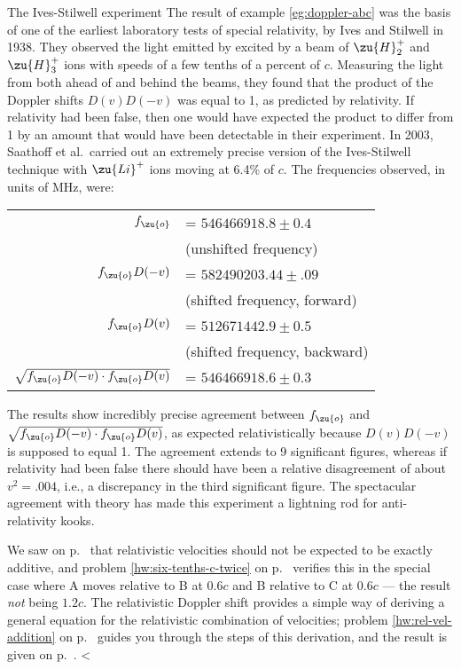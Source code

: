 \begin{eg}{The Ives-Stilwell experiment}
The result of example \ref{eg:doppler-abc} was the basis of one of the earliest laboratory tests of special relativity, by Ives and Stilwell in 1938.
They observed the light emitted by excited by a beam of $\zu{H}_2^+$ and $\zu{H}_3^+$ ions with speeds of a few tenths of a percent of $c$.
Measuring the light from both ahead of and behind the beams, they found that the product of the Doppler shifts $D(v)D(-v)$ was equal to 1,
as predicted by relativity. If relativity had been false, then one would have expected the product to differ from 1 by an amount that would
have been detectable in their experiment. In 2003, Saathoff et al.~carried out an extremely precise version of the Ives-Stilwell technique
with $\zu{Li}^+$ ions moving at 6.4\% of $c$. The frequencies observed, in units of MHz, were:

\noindent\begin{tabular}{rl}
$f_\zu{o}$ &=      $546466918.8  \pm 0.4$ \\
           & \hfill (unshifted frequency)\\
$f_\zu{o}D(-v)$ & =          $582490203.44 \pm .09$ \\
           & \hfill (shifted frequency, forward)\\
$f_\zu{o} D(v)$ & =          $512671442.9  \pm 0.5$ \\
           & \hfill (shifted frequency, backward)\\
$\sqrt{f_\zu{o}D(-v)\cdot f_\zu{o} D(v)}$ &= $546466918.6  \pm 0.3$ 
\end{tabular}

\noindent The results show incredibly precise agreement between $f_\zu{o}$ and $\sqrt{f_\zu{o}D(-v)\cdot f_\zu{o} D(v)}$, as expected
relativistically because $D(v)D(-v)$ is supposed to equal 1. The agreement extends to 9 significant figures, whereas
if relativity had been false there should have been a relative disagreement of about $v^2=.004$, i.e., a discrepancy in the third significant figure.
The spectacular agreement with theory has made this experiment a lightning rod for
anti-relativity kooks.
\end{eg}

We saw on p.~\pageref{relativistic-combination-of-vel} that relativistic velocities should not be expected to be exactly additive,
and problem \ref{hw:six-tenths-c-twice} on p.~\pageref{hw:six-tenths-c-twice} verifies this in the special case where A moves relative to B
at $0.6c$ and B relative to C at $0.6c$ --- the result \emph{not} being $1.2c$.
The relativistic Doppler shift provides a simple way of deriving a general equation for the relativistic combination 
of velocities;
problem \ref{hw:rel-vel-addition} on p.~\pageref{hw:rel-vel-addition} guides you through the steps of this derivation,
and the result is given on p.~\pageref{soln:rel-vel-addition}.
<%
